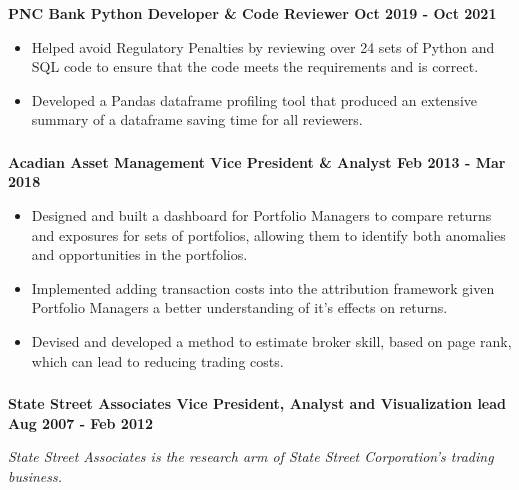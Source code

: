 \documentclass[
]{article}
\providecommand{\tightlist}{%
  \setlength{\itemsep}{0pt}\setlength{\parskip}{0pt}}
\begin{document}
\hypertarget{pnc}{\subsubsection{}\label{pnc}}
\textbf  {PNC Bank \hfill Python Developer \& Code Reviewer \hfill Oct 2019 - Oct 2021}

\vspace{-2pt}

\begin{itemize}
\tightlist
\item Helped avoid Regulatory Penalties by reviewing over 24 sets of Python and SQL code to ensure that the code meets the requirements and is correct.
\item Developed a Pandas dataframe profiling tool
that produced an extensive summary of a dataframe  saving time 
for all reviewers.
\end{itemize}

\vspace{-16pt}
\hypertarget{acadian}{\subsubsection{}\label{acadian}}
\textbf {Acadian Asset Management \hfill Vice President \& Analyst \hfill  Feb 2013 -  Mar 2018}

\begin{itemize}
\tightlist
\item
 Designed and built a dashboard for Portfolio Managers to compare returns and exposures for sets of portfolios, 
 allowing them to identify both anomalies and opportunities in the portfolios.
\item
Implemented adding transaction costs
into the attribution framework given Portfolio Managers
a better understanding of it's effects on returns.
\item 
  Devised and developed  a method to estimate broker skill, based on page rank,  which can lead to  reducing trading costs.
\end{itemize}


\vspace{-18pt}
\hypertarget{ssa}{%
\subsubsection{}\label{ssa}}
\textbf {State Street Associates \hfill Vice President, Analyst and Visualization lead \hfill Aug 2007 - Feb 2012 }

\vspace{-4pt}
{\hspace{0.1in} \footnotesize \emph{State Street Associates is the research arm of State Street Corporation's trading business.}}
\end{document}
